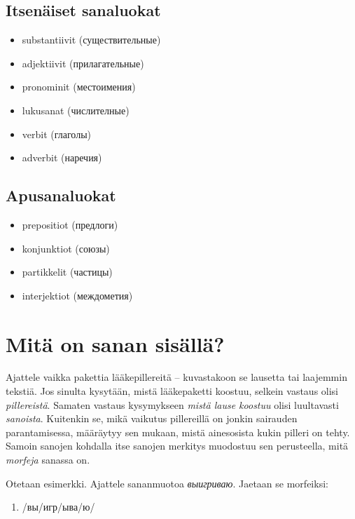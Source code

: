 \documentclass[]{scrreprt}
\providecommand{\tightlist}{%
  \setlength{\itemsep}{0pt}\setlength{\parskip}{0pt}}
\begin{document}
\subsection{Itsenäiset sanaluokat}\label{itsenuxe4iset-sanaluokat}

\begin{itemize}
\tightlist
\item
  substantiivit (существительные)
\item
  adjektiivit (прилагательные)
\item
  pronominit (местоимения)
\item
  lukusanat (числителные)
\item
  verbit (глаголы)
\item
  adverbit (наречия)
\end{itemize}

\subsection{Apusanaluokat}\label{apusanaluokat}

\begin{itemize}
\tightlist
\item
  prepositiot (предлоги)
\item
  konjunktiot (союзы)
\item
  partikkelit (частицы)
\item
  interjektiot (междометия)
\end{itemize}

\section{Mitä on sanan
sisällä?}\label{mituxe4-on-sanan-sisuxe4lluxe4}

Ajattele vaikka pakettia lääkepillereitä -- kuvastakoon se lausetta tai
laajemmin tekstiä. Jos sinulta kysytään, mistä lääkepaketti koostuu,
selkein vastaus olisi \emph{pillereistä}. Samaten vastaus kysymykseen
\emph{mistä lause koostuu} olisi luultavasti \emph{sanoista}. Kuitenkin
se, mikä vaikutus pillereillä on jonkin sairauden parantamisessa,
määräytyy sen mukaan, mistä ainesosista kukin pilleri on tehty. Samoin
sanojen kohdalla itse sanojen merkitys muodostuu sen perusteella, mitä
\emph{morfeja} sanassa on.

Otetaan esimerkki. Ajattele sananmuotoa \emph{выигриваю}. Jaetaan se
morfeiksi:

\begin{enumerate}
\def\labelenumi{(\arabic{enumi})}
\tightlist
\item
  /вы/игр/ыва/ю/
\end{enumerate}
\end{document}
